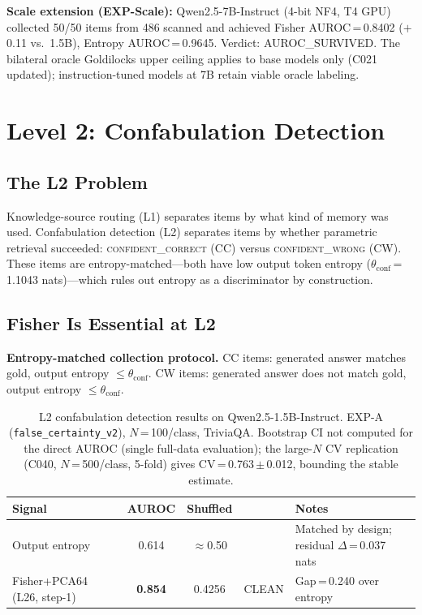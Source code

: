 \documentclass[11pt]{article}
\begin{document}
\textbf{Scale extension (EXP-Scale):} Qwen2.5-7B-Instruct (4-bit NF4, T4 GPU) collected
50/50 items from 486 scanned and achieved Fisher AUROC\,=\,0.8402 ($+$0.11 vs.\ 1.5B),
Entropy AUROC\,=\,0.9645. Verdict: AUROC\_SURVIVED. The bilateral oracle Goldilocks
upper ceiling applies to base models only (C021 updated); instruction-tuned models at
7B retain viable oracle labeling.

\section{Level 2: Confabulation Detection}
\label{sec:l2}

\subsection{The L2 Problem}

Knowledge-source routing (L1) separates items by what kind of memory was used.
Confabulation detection (L2) separates items by whether parametric retrieval
succeeded: \textsc{confident\_correct} (CC) versus \textsc{confident\_wrong} (CW).
These items are entropy-matched---both have low output token entropy
($\theta_\text{conf}$\,=\,1.1043 nats)---which rules out entropy as a discriminator
by construction.

\subsection{Fisher Is Essential at L2}

\textbf{Entropy-matched collection protocol.} CC items: generated answer matches gold,
output entropy $\leq \theta_\text{conf}$. CW items: generated answer does not match gold,
output entropy $\leq \theta_\text{conf}$.

\begin{table}[h!]
\centering
\caption{L2 confabulation detection results on Qwen2.5-1.5B-Instruct.
  EXP-A (\texttt{false\_certainty\_v2}), $N$\,=\,100/class, TriviaQA.
  Bootstrap CI not computed for the direct AUROC (single full-data evaluation); the
  large-$N$ CV replication (C040, $N$\,=\,500/class, 5-fold) gives
  CV\,=\,0.763\,$\pm$\,0.012, bounding the stable estimate.}
\begin{tabular}{lcccl}
\toprule
Signal & AUROC & Shuffled & & Notes \\
\midrule
Output entropy & 0.614 & $\approx$0.50 & & Matched by design; residual $\Delta$\,=\,0.037 nats \\
Fisher+PCA64 (L26, step-1) & \textbf{0.854} & 0.4256 & CLEAN & Gap\,=\,0.240 over entropy \\
\bottomrule
\end{tabular}
\end{table}
\end{document}
